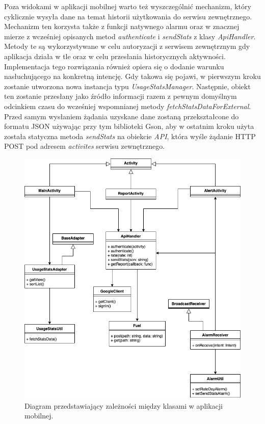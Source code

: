 \documentclass[a4paper,twoside,12pt]{book}
\begin{document}
Poza widokami w aplikacji mobilnej warto też wyszczególnić mechanizm, który cyklicznie wysyła dane na temat historii użytkowania do serwisu zewnętrznego. Mechanizm ten korzysta także z funkcji natywnego alarmu oraz w znacznej mierze z wcześniej opisanych metod \textit{authenticate} i \textit{sendStats} z klasy \textit{ApiHandler}. Metody te są wykorzystywane w celu autoryzacji z serwisem zewnętrznym gdy aplikacja działa w tle oraz w celu przesłania historycznych aktywności. Implementacja tego rozwiązania również opiera się o dodanie warunku nasłuchującego na konkretną intencję. Gdy takowa się pojawi, w pierwszym kroku zostanie utworzona nowa instancja typu \textit{UsageStatsManager}. Następnie, obiekt ten zostanie przesłany jako źródło informacji razem z pewnym domyślnym odcinkiem czasu do wcześniej wspomnianej metody \textit{fetchStatsDataForExternal}. Przed samym wysłaniem żądania uzyskane dane zostaną przekształcone do formatu JSON używając przy tym biblioteki Gson, aby w ostatnim kroku użyta została statyczna metoda \textit{sendStats} na obiekcie \textit{API}, która wyśle żądanie HTTP POST pod adresem \textit{activites} serwisu zewnętrznego.
\begin{figure}[h!]
    \centering
    \includegraphics[width=\textwidth]{images/track-app-mobile-diagram.png}
    \caption{Diagram przedstawiający zależności między klasami w aplikacji mobilnej.}
    \label{fig:mobile_uml}
\end{figure}
\end{document}
